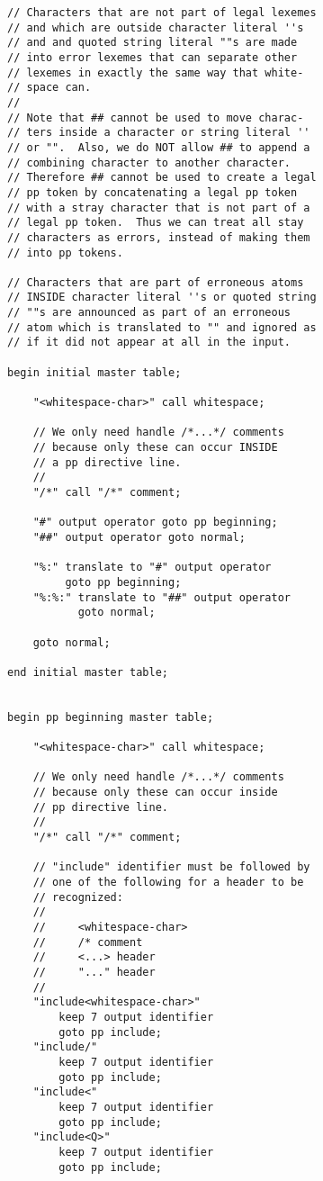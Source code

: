 \documentclass[12pt]{article}
\newenvironment{indpar}[1][0.3in]%
	{\begin{list}{}%
		     {\setlength{\itemsep}{0in}%
		      \setlength{\topsep}{0in}%
		      \setlength{\parsep}{1ex}%
		      \setlength{\labelwidth}{#1}%
		      \setlength{\leftmargin}{#1}%
		      \addtolength{\leftmargin}{\labelsep}}%
	 \item}%
	{\end{list}}
\begin{document}
\begin{indpar}
\begin{verbatim}
// Characters that are not part of legal lexemes
// and which are outside character literal ''s
// and and quoted string literal ""s are made
// into error lexemes that can separate other
// lexemes in exactly the same way that white-
// space can.
//
// Note that ## cannot be used to move charac-
// ters inside a character or string literal ''
// or "".  Also, we do NOT allow ## to append a
// combining character to another character.
// Therefore ## cannot be used to create a legal
// pp token by concatenating a legal pp token
// with a stray character that is not part of a
// legal pp token.  Thus we can treat all stay
// characters as errors, instead of making them
// into pp tokens.

// Characters that are part of erroneous atoms
// INSIDE character literal ''s or quoted string
// ""s are announced as part of an erroneous
// atom which is translated to "" and ignored as
// if it did not appear at all in the input.

begin initial master table;

    "<whitespace-char>" call whitespace;

    // We only need handle /*...*/ comments
    // because only these can occur INSIDE
    // a pp directive line.
    //
    "/*" call "/*" comment;

    "#" output operator goto pp beginning;
    "##" output operator goto normal;

    "%:" translate to "#" output operator
         goto pp beginning;
    "%:%:" translate to "##" output operator
           goto normal;

    goto normal;

end initial master table;


begin pp beginning master table;

    "<whitespace-char>" call whitespace;

    // We only need handle /*...*/ comments
    // because only these can occur inside
    // pp directive line.
    //
    "/*" call "/*" comment;

    // "include" identifier must be followed by
    // one of the following for a header to be
    // recognized:
    //
    //     <whitespace-char>
    //     /* comment
    //     <...> header
    //     "..." header
    //
    "include<whitespace-char>"
        keep 7 output identifier
        goto pp include;
    "include/"
        keep 7 output identifier
        goto pp include;
    "include<"
        keep 7 output identifier
        goto pp include;
    "include<Q>"
        keep 7 output identifier
        goto pp include;


\end{verbatim}
\end{indpar}
\end{document}
